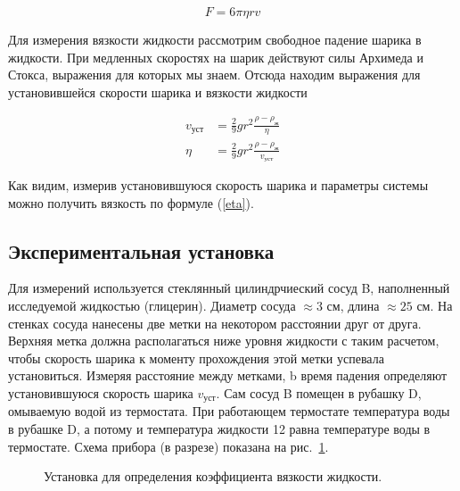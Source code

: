 \documentclass[a4paper, 12pt]{article}
\begin{document}
    \begin{equation}\label{stokes}
        F = 6\pi\eta rv
    \end{equation}


    Для измерения вязкости жидкости рассмотрим свободное падение шарика в жидкости. При медленных скоростях на шарик действуют силы Архимеда и Стокса, выражения для которых мы знаем. Отсюда находим выражения для установившейся скорости шарика и вязкости жидкости

    \begin{align}
        v_{уст}&=\frac{2}{9}gr^2\frac{\rho - \rho_ж}{\eta}\label{v_ust}\\
        \eta&=\frac{2}{9}gr^2\frac{\rho - \rho_ж}{v_{уст}}\label{eta}
    \end{align}

    Как видим, измерив установившуюся скорость шарика и параметры системы можно получить вязкость по формуле (\ref{eta}).

    \subsection{Экспериментальная установка}
    Для измерений используется стеклянный цилиндрчиеский сосуд B, наполненный исследуемой жидкостью (глицерин). Диаметр сосуда $\approx 3$ см, длина $\approx 25$ см. На стенках сосуда нанесены две метки на некотором расстоянии друг от друга. Верхняя метка должна располагаться ниже уровня жидкости с таким расчетом, чтобы скорость шарика к моменту прохождения этой метки успевала установиться. Измеряя расстояние между метками, b время падения определяют установившуюся скорость шарика $v_{уст}$. Сам сосуд B помещен в рубашку D, омываемую водой из термостата. При работающем термостате температура воды в рубашке D, а потому и температура жидкости 12 равна температуре воды в термостате.
    Схема прибора (в разрезе) показана на рис.~\ref{ustanovka}.
    \begin{figure}[h]
        \caption{Установка для определения коэффициента вязкости жидкости.}
        \label{ustanovka}
    \end{figure}
\end{document}
